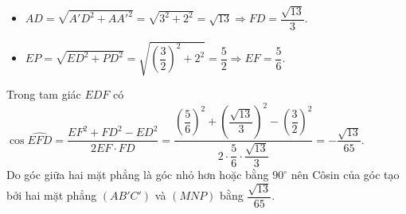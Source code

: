 \begin{ex}
{\begin{itemize}
			\item $AD=\sqrt{A'D^2+AA'^2}=\sqrt{3^2+2^2}=\sqrt{13}\Rightarrow  FD=\dfrac{\sqrt{13}}{3}$.
			\item  $EP=\sqrt{ED^2+PD^2}=\sqrt{\left(\dfrac{3}{2}\right)^2+2^2}=\dfrac{5}{2}\Rightarrow EF=\dfrac{5}{6}$.
		\end{itemize}
		Trong tam giác $EDF$ có $\cos\widehat{EFD}=\dfrac{EF^2+FD^2-ED^2}{2EF\cdot FD}=\dfrac{\left(\dfrac{5}{6}\right)^2+\left(\dfrac{\sqrt{13}}{3}\right)^2-\left(\dfrac{3}{2}\right)^2}{2\cdot \dfrac{5}{6}\cdot \dfrac{\sqrt{13}}{3}}=-\dfrac{\sqrt{13}}{65}$.\\ 
		Do góc giữa hai mặt phẳng là góc nhỏ hơn hoặc bằng $90^\circ$ nên  Côsin của góc tạo bởi hai mặt phẳng $(AB'C')$ và $(MNP)$ bằng $\dfrac{\sqrt{13}}{65}$.
	 }
\end{ex}

